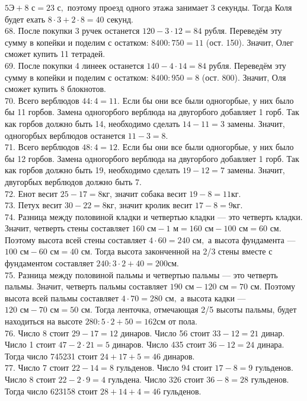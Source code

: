 \documentclass[12pt]{article}
\begin{document}
$5\text{Э}+8\text{ с}=23\text{ с},$ поэтому проезд одного этажа занимает 3 секунды. Тогда Коля будет ехать $8\cdot3+2\cdot8=40$ секунд.\\
68. После покупки 3 ручек останется $120-3\cdot12=84$  рубля. Переведём эту сумму в копейки и поделим с остатком: $8400:750=11$ (ост. 150). Значит, Олег сможет купить 11 тетрадей.\\
69. После покупки 4 линеек останется $140-4\cdot14=84$ рубля. Переведём эту сумму в копейки и поделим с остатком: $8400:950=8$ (ост. 800). Значит, Оля сможет купить 8 блокнотов.\\
70. Всего верблюдов $44:4=11.$ Если бы они все были одногорбые, у них было бы 11 горбов. Замена одногорбого верблюда на двугорбого добавляет 1 горб. Так как горбов должно быть 14, необходимо сделать $14-11=3$ замены. Значит, одногорбых верблюдов останется $11-3=8.$\\
71. Всего верблюдов $48:4=12.$ Если бы они все были одногорбые, у них было бы 12 горбов. Замена одногорбого верблюда на двугорбого добавляет 1 горб. Так как горбов должно быть 19, необходимо сделать $19-12=7$ замены. Значит, двугорбых верблюдов должно быть 7.\\
72. Енот весит $25-17=8$кг, значит собака весит $19-8=11$кг.\\
73. Петух весит $30-22=8$кг, значит кролик весит $17-8=9$кг.\\
74. Разница между половиной кладки и четвертью кладки --- это четверть кладки. Значит, четверть стены составляет $160\text{ см}-1\text{ м}=160\text{ см}-100\text{ см}=60\text{ см}.$ Поэтому высота всей стены составляет $4\cdot60=240\text{ см},$ а высота фундамента --- $100\text{ см}-60\text{ см}=40\text{ см}.$ Тогда высота законченной на 2/3 стены вместе с фундаментом составляет $240:3\cdot2+40=200$см.\\
75. Разница между половиной пальмы и четвертью пальмы --- это четверть пальмы. Значит, четверть пальмы составляет $190\text{ см}-120\text{ см}=70\text{ см}.$
Поэтому высота всей пальмы составляет $4\cdot70=280\text{ см},$ а высота кадки --- $120\text{ см}-70\text{ см}=50\text{ см}.$ Тогда ленточка, отмечающая 2/5 высоты пальмы, будет находиться на высоте $280:5\cdot2+50=162$см от пола.\\
76. Число 8 стоит $29-17=12$ динаров. Число 56 стоит $33-12=21$ динар. Число 1 стоит $47-2\cdot21=5$ динаров. Число 435 стоит $36-12=24$ динара. Тогда число 745231 стоит $24+17+5=46$ динаров.\\
77. Число 7 стоит $22-14=8$ гульденов. Число 94 стоит $17-8=9$ гульденов. Число 8 стоит $22-2\cdot9=4$ гульдена. Число 326 стоит $36-8=28$ гульденов. Тогда число 623158 стоит $28+14+4=46$ гульденов.\\
\end{document}
